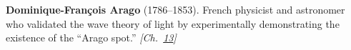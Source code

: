 \textbf{Dominique-François Arago} (1786–1853). French physicist and astronomer who validated the wave theory of light by experimentally demonstrating the existence of the ``Arago spot.'' \emph{[Ch.~\hyperref[ch:poissonsspot]{13}]}

